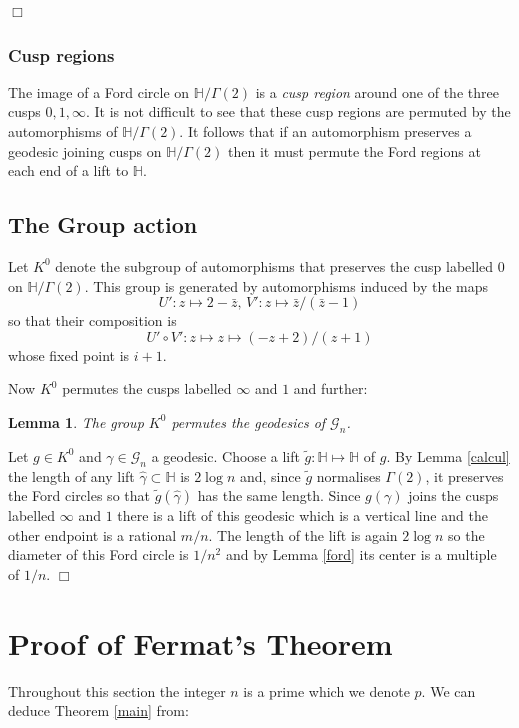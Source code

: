 \documentclass[12pt,a4paper]{amsart}
\newtheorem{lem}[thm]{Lemma}
\def\HH{\mathbb{H}}
\def\xx{\HH/g2}
\def\g2{\Gamma(2)}
\def\xx{\HH/\g2}
\def\gg{\mathcal{G}_n}
\begin{document}
\hfill $\Box$

\subsubsection{Cusp regions}

The image of a Ford circle on $\xx$ is a \textit{cusp region}
around one of the three cusps $0,1,\infty$.
It is not difficult to see that these cusp regions 
are permuted by the automorphisms of $\xx$.
It follows that if an automorphism preserves a geodesic  joining cusps on $\xx$
then it must permute the Ford regions at each end of a lift to $\HH$.

\subsection{The Group action}

Let  $K^0$ denote 
the subgroup of automorphisms 
that preserves the cusp labelled $0$ on $\xx$.
This group is generated by  automorphisms induced by the maps
$$U': z \mapsto 2-\bar{z},\, V' : z \mapsto \bar{z}/(\bar{z} - 1)$$
so that  their composition is 
$$U'\circ V' : z \mapsto z \mapsto (-z + 2) /( z + 1)$$
whose fixed point is $i+1$.


Now $K^0$ permutes the cusps labelled $\infty$ and $1$
and further:

\begin{lem} \label{action}
 The group $K^0$  permutes the geodesics of $\gg$.
\end{lem}
\proof
Let $g \in K^0$ and $\gamma \in \gg$ a geodesic.
Choose a lift $\tilde{g} : \HH \mapsto \HH$ of $g$.
By Lemma  \ref{calcul} the  length of any lift  $\hat{\gamma} \subset \HH$ is $2\log n$
and, since $\tilde{g}$ normalises $\g2$, it preserves the Ford circles
so that  $\tilde{g}(\hat{\gamma})$ has the same length.
Since $g(\gamma)$ joins the cusps labelled $\infty$ and $1$
there is a lift of this geodesic which is a vertical line
 and the other endpoint is a rational $m/n$.
The length of the lift  is again $2 \log n$ so
the diameter of this  Ford circle is $1/n^2$
and by Lemma \ref{ford} its center is a multiple of $1/n$.
\hfill $\Box$


 
 \section{Proof of Fermat's Theorem}

Throughout this section the integer $n$ is a prime which we denote $p$.
We can deduce Theorem \ref{main} from:
\end{document}
